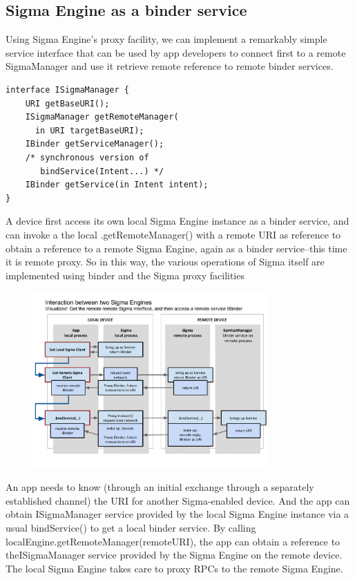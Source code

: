 \documentclass[prodmode]{acmlarge}
\begin{document}
\subsection{Sigma Engine as a binder service}
Using Sigma Engine's proxy facility, we can implement a remarkably simple service interface that can be used by app developers to connect first to a remote SigmaManager and use it retrieve remote reference to remote binder services.

\begin{Verbatim}[samepage=true]
interface ISigmaManager {
    URI getBaseURI();
    ISigmaManager getRemoteManager(
      in URI targetBaseURI);
    IBinder getServiceManager();
    /* synchronous version of
       bindService(Intent...) */
    IBinder getService(in Intent intent);
}
\end{Verbatim}

A device first access its own local Sigma Engine instance as a binder service, and can invoke a the local .getRemoteManager() with a remote URI as reference to obtain a reference to a remote Sigma Engine, again as a binder service--this time it is remote proxy. So in this way, the various operations of Sigma itself are implemented using binder and the Sigma proxy facilities

\begin{figure}[t!]
\centering
\includegraphics[width=0.8\textwidth]{drawings/SigmaEngineInteraction.pdf}
\end{figure}

An app needs to know (through an initial exchange through a separately established channel) the URI for another Sigma-enabled device. And the app can obtain ISigmaManager service provided by the local Sigma Engine instance via a usual bindService() to get a local binder service. By calling localEngine.getRemoteManager(remoteURI), the app can obtain a reference to theISigmaManager service provided by the Sigma Engine on the remote device. The local Sigma Engine takes care to proxy RPCs to the remote Sigma Engine.
\end{document}
